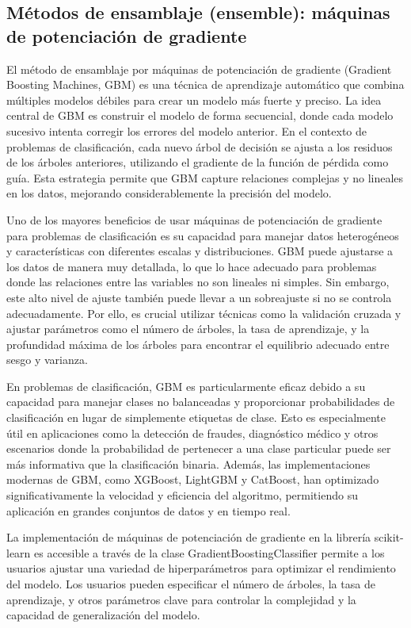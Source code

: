 \subsection{Métodos de ensamblaje (ensemble): máquinas de potenciación de gradiente}
\label{subsec:model-gradient}

El método de ensamblaje por máquinas de potenciación de gradiente (Gradient Boosting Machines, GBM) es una técnica de aprendizaje automático que combina múltiples modelos débiles para crear un modelo más fuerte y preciso. La idea central de GBM es construir el modelo de forma secuencial, donde cada modelo sucesivo intenta corregir los errores del modelo anterior. En el contexto de problemas de clasificación, cada nuevo árbol de decisión se ajusta a los residuos de los árboles anteriores, utilizando el gradiente de la función de pérdida como guía. Esta estrategia permite que GBM capture relaciones complejas y no lineales en los datos, mejorando considerablemente la precisión del modelo.

Uno de los mayores beneficios de usar máquinas de potenciación de gradiente para problemas de clasificación es su capacidad para manejar datos heterogéneos y características con diferentes escalas y distribuciones. GBM puede ajustarse a los datos de manera muy detallada, lo que lo hace adecuado para problemas donde las relaciones entre las variables no son lineales ni simples. Sin embargo, este alto nivel de ajuste también puede llevar a un sobreajuste si no se controla adecuadamente. Por ello, es crucial utilizar técnicas como la validación cruzada y ajustar parámetros como el número de árboles, la tasa de aprendizaje, y la profundidad máxima de los árboles para encontrar el equilibrio adecuado entre sesgo y varianza.

En problemas de clasificación, GBM es particularmente eficaz debido a su capacidad para manejar clases no balanceadas y proporcionar probabilidades de clasificación en lugar de simplemente etiquetas de clase. Esto es especialmente útil en aplicaciones como la detección de fraudes, diagnóstico médico y otros escenarios donde la probabilidad de pertenecer a una clase particular puede ser más informativa que la clasificación binaria. Además, las implementaciones modernas de GBM, como XGBoost, LightGBM y CatBoost, han optimizado significativamente la velocidad y eficiencia del algoritmo, permitiendo su aplicación en grandes conjuntos de datos y en tiempo real.

La implementación de máquinas de potenciación de gradiente en la librería scikit-learn es accesible a través de la clase GradientBoostingClassifier \cite{sk-gradient-boost} permite a los usuarios ajustar una variedad de hiperparámetros para optimizar el rendimiento del modelo. Los usuarios pueden especificar el número de árboles, la tasa de aprendizaje, y otros parámetros clave para controlar la complejidad y la capacidad de generalización del modelo.

